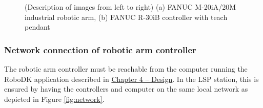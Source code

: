 \begin{figure}[H]
\begin{center}
  \hspace{1cm}
  \caption[(Description of images from left to right) (a) FANUC M-20iA/20M industrial robotic arm, (b) FANUC R-30iB controller with teach pendant]
    {(Description of images from left to right) (a) FANUC M-20iA/20M industrial robotic arm, (b) FANUC R-30iB controller with teach pendant \cite{fanucrobotcontroller}}
  \label{fig:fanucrobot}
\end{center}
\end{figure}


\subsubsection*{Network connection of robotic arm controller}


The robotic arm controller must be reachable from the computer running the RoboDK application described in \hyperref[chap:design]{Chapter 4 -- Design}. In the LSP station, this is ensured by having the controllers and computer on the same local network as depicted in Figure \ref{fig:network}. 

